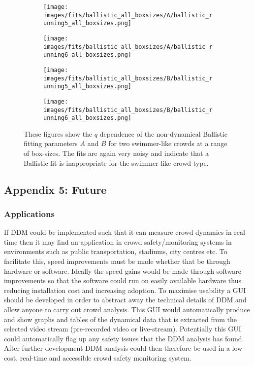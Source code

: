\documentclass[10pt]{article}
\begin{document}
\begin{figure}[H]
\begin{subfigure}[t]{.5\textwidth}
  \centering
 \texttt{[image: images/fits/ballistic\_all\_boxsizes/A/ballistic\_running5\_all\_boxsizes.png]}
  \caption{}
\end{subfigure}%
\hfill
\begin{subfigure}[t]{.5\textwidth}
  \centering
  \texttt{[image: images/fits/ballistic\_all\_boxsizes/A/ballistic\_running6\_all\_boxsizes.png]}
  \caption{}
\end{subfigure}
\label{fig:running_ballistic_fits_A_all_boxsizes}
\par\bigskip
\begin{subfigure}[t]{.5\textwidth}
  \centering
 \texttt{[image: images/fits/ballistic\_all\_boxsizes/B/ballistic\_running5\_all\_boxsizes.png]}
  \caption{}
\end{subfigure}%
\hfill
\begin{subfigure}[t]{.5\textwidth}
  \centering
  \texttt{[image: images/fits/ballistic\_all\_boxsizes/B/ballistic\_running6\_all\_boxsizes.png]}
  \caption{}
\end{subfigure}
\caption{These figures show the $q$ dependence of the non-dynamical Ballistic fitting parameters $A$ and $B$ for two swimmer-like crowds at a range of box-sizes. The fits are again very noisy and indicate that a Ballistic fit is inappropriate for the swimmer-like crowd type.}
\label{fig:running_ballistic_fits_B_all_boxsizes}
\end{figure}

\subsection{Appendix 5: Future}
\label{section:future}
\subsubsection{Applications}
If DDM could be implemented such that it can measure crowd dynamics in real time then it may find an application in crowd safety/monitoring systems in environments such as public transportation, stadiums, city centres etc. To facilitate this, speed improvements must be made whether that be through hardware or software. Ideally the speed gains would be made through software improvements so that the software could run on easily available hardware thus reducing installation cost and increasing adoption. To maximise usability a GUI should be developed in order to abstract away the technical details of DDM and allow anyone to carry out crowd analysis. This GUI would automatically produce and show graphs and tables of the dynamical data that is extracted from the selected video stream (pre-recorded video or live-stream). Potentially this GUI could automatically flag up any safety issues that the DDM analysis has found. After further development DDM analysis could then therefore be used in a low cost, real-time and accessible crowd safety monitoring system.
\end{document}
